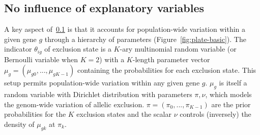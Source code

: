 \documentclass[letterpaper]{article}
\begin{document}
\renewcommand{\thesubsection}{M\arabic{model}}

\subsection{No influence of explanatory variables }
\label{sec:model-basic}

A key aspect of~\ref{sec:model-basic} is that it accounts for population-wide
variation within a given gene \(g\) through a hierarchy of parameters
(Figure~\ref{fig:plate-basic}).  The indicator \(\theta_{ig}\) of exclusion
state is a \(K\)-ary multinomial random variable (or Bernoulli variable when
\(K=2\)) with a \(K\)-length parameter vector
\(\mu_g=(\mu_{g0},...,\mu_{gK-1})\) containing the probabilities for each
exclusion state.  This setup permits population-wide variation within any
given gene \(g\).  \(\mu_g\) is itself a random variable with Dirichlet
distribution with parameters \(\pi,\nu\), which models the genom-wide
variation of allelic exclusion.  \(\pi=(\pi_0,...,\pi_{K-1})\) are the prior
probabilities for the \(K\) exclusion states and the scalar \(\nu\) controls
(inversely) the density of \(\mu_{gk}\) at \(\pi_k\).
\end{document}
